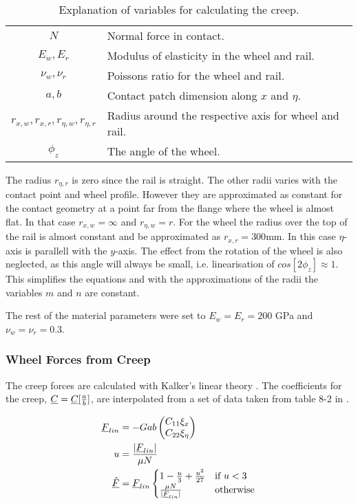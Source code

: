 \begin{table}[htpb!]
 \centering
 \caption{Explanation of variables for calculating the creep.}
 \begin{tabular}{c | l}
  $N$                                     & Normal force in contact.\\
  $E_w,E_r$                               & Modulus of elasticity in the wheel and rail.\\
  $\nu_w,\nu_r$                           & Poissons ratio for the wheel and rail.\\
  $a,b$                                   & Contact patch dimension along $x$ and $\eta$.\\
  $r_{x,w},r_{x,r},r_{\eta,w},r_{\eta,r}$ & Radius around the respective axis for wheel and rail.\\
  $\phi_z$                                & The angle of the wheel.
 \end{tabular}
\end{table}
The radius $r_{\eta,r}$ is zero since the rail is straight. 
The other radii varies with the contact point and wheel profile. However they are approximated as constant for the contact geometry at a point far from the flange where the wheel is almost flat. In that case $r_{x,w}=\infty$ and $r_{\eta,w} = r$.
For the wheel the radius over the top of the rail is almost constant and be approximated as $r_{x,r} = 300$mm.
In this case $\eta$-axis is parallell with the $y$-axis.
The effect from the rotation of the wheel is also neglected, as this angle will always be small, i.e. linearisation of $cos[2\phi_z] \approx 1$. This simplifies the equations and with the approximations of the radii the variables $m$ and $n$ are constant.

The rest of the material parameters were set to $E_w = E_r = 200$ GPa and $\nu_w = \nu_r = 0.3$.


\subsubsection{Wheel Forces from Creep}
The creep forces are calculated with Kalker's linear theory \cite{railvehicledynamics_eandersson}.
The coefficients for the creep, $\underline{C} = \underline{C}[\frac{a}{b}]$, are interpolated from a set of data taken from table 8-2 in \cite{railvehicledynamics_eandersson}.

\begin{align}
 \underline{F}_{lin} &= - G a b \begin{pmatrix}
                          C_{11} \xi_x\\C_{22} \xi_\eta
                         \end{pmatrix}\\
 u            &= \frac{|\underline{F}_{lin}|}{\mu N}\\
 \underline{\hat{F}} &= \underline{F}_{lin} \begin{cases}
                  1-\frac{u}{3}+\frac{u^2}{27} &\text{if $u < 3$} \\
                  \frac{\mu N }{|\underline{F}_{lin}|} & \text{otherwise}
                 \end{cases}
\end{align}

